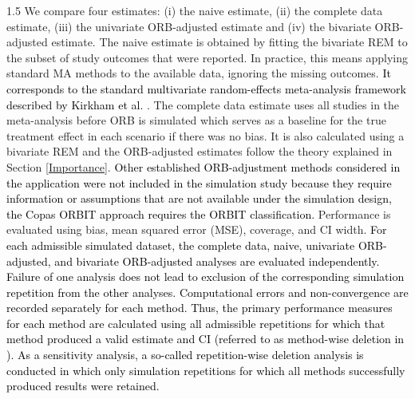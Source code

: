 \documentclass{article}
\newcommand{\mycolor}[1]{\textcolor{black}{#1}}
\begin{document}
\begin{spacing}{1.5}
We compare four estimates: (i) the naive estimate, (ii) the complete data estimate, (iii) the univariate ORB-adjusted estimate and (iv) the bivariate ORB-adjusted estimate. The naive estimate is obtained by fitting the bivariate REM to the subset of study outcomes that were reported. In practice, this means applying standard MA methods to the available data, ignoring the missing outcomes. \mycolor{It corresponds to the standard multivariate random-effects meta-analysis framework described by Kirkham et al. \cite{kirkham2012multivariate}}. The  complete  data  estimate  uses  all  studies  in the  meta-analysis  before  ORB  is  simulated which serves as a baseline for the true treatment effect in each scenario if there was no bias. It is also calculated using a bivariate REM and the ORB-adjusted estimates follow the theory explained in Section \ref{Importance}. \mycolor{Other established ORB-adjustment methods considered in the application were not included in the simulation study because they require information or assumptions that are not available under the simulation design, \eg the Copas ORBIT approach requires the ORBIT classification.}  Performance is evaluated using bias, mean squared error (MSE), coverage, and CI width. \mycolor{For each admissible simulated dataset, the complete data, naive, univariate ORB-adjusted, and bivariate ORB-adjusted analyses are evaluated independently. Failure of one analysis does not lead to exclusion of the corresponding simulation repetition from the other analyses. Computational errors and non-convergence are recorded separately for each method. Thus, the primary performance measures for each method are calculated using all admissible repetitions for which that method produced a valid estimate and CI (referred to as method-wise deletion in \cite{pawel2025handling}). As a sensitivity analysis, a so-called repetition-wise deletion analysis is conducted in which only simulation repetitions for which all methods successfully produced results were retained.}



\end{spacing}
\end{document}
